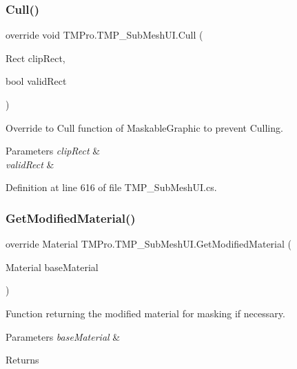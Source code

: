 \mbox{\label{class_t_m_pro_1_1_t_m_p___sub_mesh_u_i_ab4b2cf894e690a63576d8713a5729099}} 
\subsubsection{\texorpdfstring{Cull()}{Cull()}}
{\footnotesize\ttfamily override void T\+M\+Pro.\+T\+M\+P\+\_\+\+Sub\+Mesh\+U\+I.\+Cull (\begin{DoxyParamCaption}\item[{Rect}]{clip\+Rect,  }\item[{bool}]{valid\+Rect }\end{DoxyParamCaption})}



Override to Cull function of Maskable\+Graphic to prevent Culling. 


\begin{DoxyParams}{Parameters}
{\em clip\+Rect} & \\
\hline
{\em valid\+Rect} & \\
\hline
\end{DoxyParams}


Definition at line 616 of file T\+M\+P\+\_\+\+Sub\+Mesh\+U\+I.\+cs.

\mbox{\label{class_t_m_pro_1_1_t_m_p___sub_mesh_u_i_a687aa0d711bf32e50c11a403493c2667}} 
\subsubsection{\texorpdfstring{GetModifiedMaterial()}{GetModifiedMaterial()}}
{\footnotesize\ttfamily override Material T\+M\+Pro.\+T\+M\+P\+\_\+\+Sub\+Mesh\+U\+I.\+Get\+Modified\+Material (\begin{DoxyParamCaption}\item[{Material}]{base\+Material }\end{DoxyParamCaption})}



Function returning the modified material for masking if necessary. 


\begin{DoxyParams}{Parameters}
{\em base\+Material} & \\
\hline
\end{DoxyParams}
\begin{DoxyReturn}{Returns}

\end{DoxyReturn}


